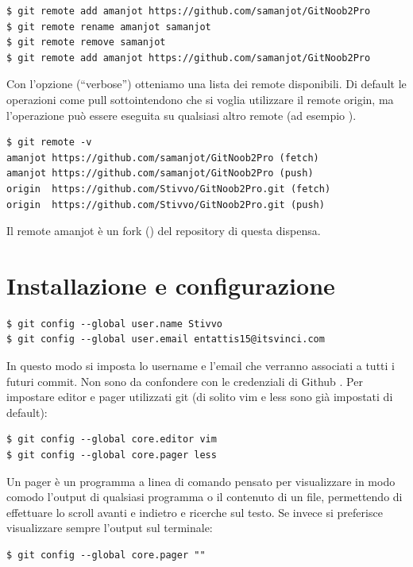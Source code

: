 \documentclass{article}
\begin{document}
\begin{verbatim}
$ git remote add amanjot https://github.com/samanjot/GitNoob2Pro
$ git remote rename amanjot samanjot
$ git remote remove samanjot
$ git remote add amanjot https://github.com/samanjot/GitNoob2Pro
\end{verbatim}

Con l'opzione  (``verbose'') otteniamo una lista dei remote disponibili.
Di default le operazioni come pull sottointendono che si voglia utilizzare il 
remote origin, ma l'operazione può essere eseguita su qualsiasi altro remote
(ad esempio ).

\begin{verbatim}
$ git remote -v
amanjot	https://github.com/samanjot/GitNoob2Pro (fetch)
amanjot	https://github.com/samanjot/GitNoob2Pro (push)
origin	https://github.com/Stivvo/GitNoob2Pro.git (fetch)
origin	https://github.com/Stivvo/GitNoob2Pro.git (push)
\end{verbatim}

Il remote amanjot è un fork () del repository di questa dispensa.

\section{Installazione e configurazione\label{configurazione}}
\begin{verbatim}
$ git config --global user.name Stivvo
$ git config --global user.email entattis15@itsvinci.com
\end{verbatim}

In questo modo si imposta lo username e l'email che verranno associati a tutti i
futuri commit. Non sono da confondere con le credenziali di Github .
Per impostare editor e pager utilizzati git (di solito vim e less sono già 
impostati di default):

\begin{verbatim}
$ git config --global core.editor vim
$ git config --global core.pager less
\end{verbatim}

Un pager è un programma a linea di comando pensato per visualizzare in modo comodo
l'output di qualsiasi programma o il contenuto di un file, permettendo di
effettuare lo scroll avanti e indietro e ricerche sul testo.
Se invece si preferisce visualizzare sempre l'output sul terminale:

\begin{verbatim}
$ git config --global core.pager ""
\end{verbatim}
\end{document}
